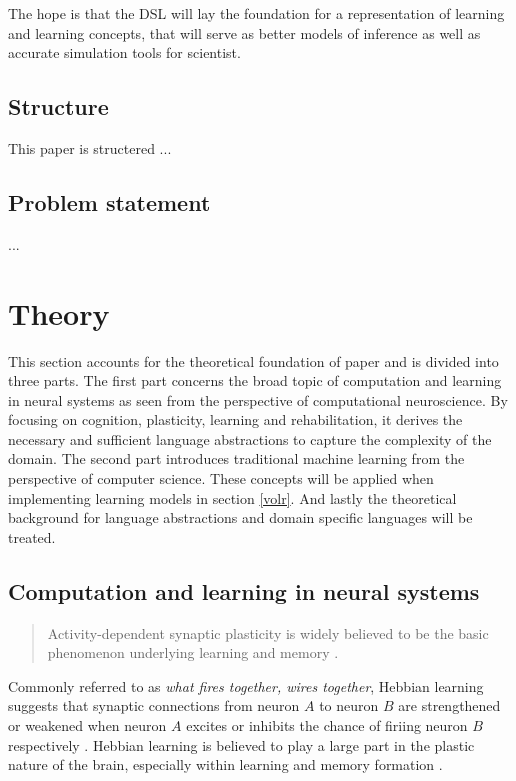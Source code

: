 \documentclass[a4paper,oneside]{memoir}
\begin{document}
The hope is that the DSL will lay the foundation for a representation of
learning and learning concepts, that will serve as better models of inference
as well as accurate simulation tools for scientist.

\subsection{Structure}
This paper is structered ...

\subsection{Problem statement}
...

\section{Theory}
This section accounts for the theoretical foundation of paper and is divided
into three parts.
The first part concerns the broad topic of computation and learning in neural
systems as seen from the perspective of computational neuroscience. By focusing
on cognition, plasticity, learning and rehabilitation, it derives
the necessary and sufficient language abstractions to capture the complexity
of the domain.
The second part introduces traditional machine learning from the perspective of
computer science. These concepts will be applied when implementing learning
models in section \ref{volr}.
And lastly the theoretical background for language abstractions and domain
specific languages will be treated.

\subsection{Computation and learning in neural systems}
\begin{quote}
  Activity-dependent synaptic plasticity is widely believed to be the basic
  phenomenon underlying learning and memory \autocite{dayan2001}.
\end{quote}

Commonly referred to as \textit{what fires together, wires together}, Hebbian
learning suggests that synaptic connections from neuron $A$ to neuron $B$
are strengthened or weakened when neuron $A$ excites or inhibits the chance of
firiing neuron $B$ respectively \autocite{dayan2001}.
Hebbian learning is believed to play a large part in the plastic nature of the
brain, especially within learning and memory formation
\autocite{dayan2001, Johnston2009, Robertson1999}.
\end{document}
